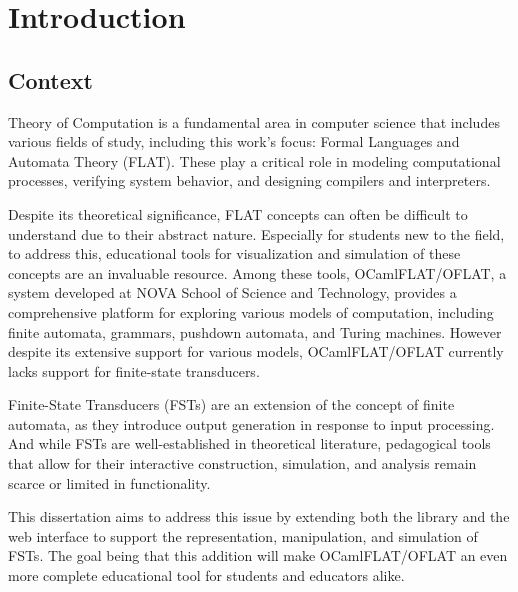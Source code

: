 
%

\chapter{Introduction}
\label{cha:introduction}

\section{Context}

Theory of Computation is a fundamental area in computer science that includes various
fields of study, including this work's focus: Formal Languages and Automata
Theory (FLAT). These play a critical role in modeling computational processes, verifying system behavior, 
and designing compilers and interpreters. 

Despite its theoretical significance, FLAT concepts can often be difficult to understand due to their abstract nature. 
Especially for students new to the field, to address this, educational
tools for visualization and simulation of these concepts are an invaluable resource. 
Among these tools, OCamlFLAT/OFLAT, a system developed at NOVA School of Science and Technology,
provides a comprehensive platform for exploring various models of computation, including finite automata, grammars, pushdown automata, and Turing machines.
However despite its extensive support for various models, OCamlFLAT/OFLAT currently lacks support for finite-state transducers. 

Finite-State Transducers (FSTs) are an extension of the concept of finite automata, 
as they introduce output generation in response to input processing.
And while FSTs are well-established in theoretical literature, pedagogical tools 
that allow for their interactive construction, simulation, and analysis remain scarce or limited in functionality.

This dissertation aims to address this issue by extending both the library and the web interface to support the representation, manipulation, and simulation of FSTs. 
The goal being that this addition will make OCamlFLAT/OFLAT an even more complete educational tool for students and educators alike.

